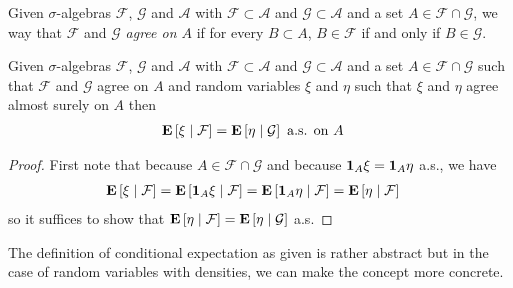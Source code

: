 \begin{defn}Given $\sigma$-algebras $\mathcal{F}$, $\mathcal{G}$ and
  $\mathcal{A}$ with $\mathcal{F} \subset \mathcal{A}$ and
  $\mathcal{G} \subset \mathcal{A}$ and a set $A \in \mathcal{F} \cap
  \mathcal{G}$, we way that $\mathcal{F}$ and $\mathcal{G}$
  \emph{agree on $A$} if for every $B \subset A$, $B \in \mathcal{F}$
  if and only if $B \in \mathcal{G}$.
\end{defn}
\begin{lem}Given $\sigma$-algebras $\mathcal{F}$, $\mathcal{G}$ and
  $\mathcal{A}$ with $\mathcal{F} \subset \mathcal{A}$ and
  $\mathcal{G} \subset \mathcal{A}$ and a set $A \in \mathcal{F} \cap
  \mathcal{G}$ such that $\mathcal{F}$ and $\mathcal{G}$ agree on $A$
  and random variables $\xi$ and $\eta$ such that $\xi$ and $\eta$
  agree almost surely on $A$ then
\begin{align*}
\cexpectationlong{\mathcal{F}}{\xi} &=
\cexpectationlong{\mathcal{G}}{\eta} \text{ a.s. on $A$}
\end{align*}
\end{lem}
\begin{proof}
First note that because $A \in \mathcal{F} \cap \mathcal{G}$ and
because $\characteristic{A}\xi = \characteristic{A}\eta$ a.s., we have
\begin{align*}
\cexpectationlong{\mathcal{F}}{\xi}  &=
\cexpectationlong{\mathcal{F}}{\characteristic{A}\xi} =
\cexpectationlong{\mathcal{F}}{\characteristic{A}\eta} = \cexpectationlong{\mathcal{F}}{\eta} 
\end{align*}
so it suffices to show that $\cexpectationlong{\mathcal{F}}{\eta} =
\cexpectationlong{\mathcal{G}}{\eta}$ a.s.
\end{proof}

The definition of conditional expectation as given is rather abstract
but in the case of random variables with densities, we can make the
concept more concrete.

